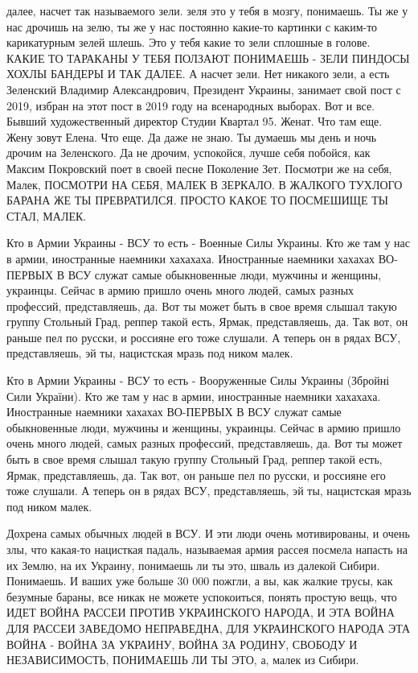 далее, насчет так называемого зели. зеля это у тебя в мозгу, понимаешь. Ты же у
нас дрочишь на зелю, ты же у нас постоянно какие-то картинки с каким-то
карикатурным зелей шлешь. Это у тебя какие то зели сплошные в голове. КАКИЕ ТО
ТАРАКАНЫ У ТЕБЯ ПОЛЗАЮТ ПОНИМАЕШЬ - ЗЕЛИ ПИНДОСЫ ХОХЛЫ БАНДЕРЫ И ТАК ДАЛЕЕ. А
насчет зели. Нет никакого зели, а есть Зеленский Владимир Александрович,
Президент Украины, занимает свой пост с 2019, избран на этот пост в 2019 году
на всенародных выборах. Вот и все. Бывший художественный директор Студии
Квартал 95. Женат. Что там еще. Жену зовут Елена. Что еще. Да даже не знаю. Ты
думаешь мы день и ночь дрочим на Зеленского. Да не дрочим, успокойся, лучше
себя побойся, как Максим Покровский поет в своей песне Поколение Зет. Посмотри
же на себя, Малек, ПОСМОТРИ НА СЕБЯ, МАЛЕК В ЗЕРКАЛО. В ЖАЛКОГО ТУХЛОГО БАРАНА
ЖЕ ТЫ ПРЕВРАТИЛСЯ. ПРОСТО КАКОЕ ТО ПОСМЕШИЩЕ ТЫ СТАЛ, МАЛЕК.

Кто в Армии Украины - ВСУ то есть - Военные Силы Украины. Кто же там у нас в
армии, иностранные наемники хахахаха. Иностранные наемники хахахах ВО-ПЕРВЫХ В
ВСУ служат самые обыкновенные люди, мужчины и женщины, украинцы. Сейчас в армию
пришло очень много людей, самых разных профессий, представляешь, да. Вот ты
может быть в свое время слышал такую группу Стольный Град, реппер такой есть,
Ярмак, представляешь, да. Так вот, он раньше пел по русски, и россияне его тоже
слушали. А теперь он в рядах ВСУ, представляешь, эй ты, нацистская мразь под
ником малек.

Кто в Армии Украины - ВСУ то есть - Вооруженные Силы Украины (Збройні Сили
України). Кто же там у нас в армии, иностранные наемники хахахаха. Иностранные
наемники хахахах ВО-ПЕРВЫХ В ВСУ служат самые обыкновенные люди, мужчины и
женщины, украинцы. Сейчас в армию пришло очень много людей, самых разных
профессий, представляешь, да. Вот ты может быть в свое время слышал такую
группу Стольный Град, реппер такой есть, Ярмак, представляешь, да. Так вот, он
раньше пел по русски, и россияне его тоже слушали. А теперь он в рядах ВСУ,
представляешь, эй ты, нацистская мразь под ником малек.

Дохрена самых обычных людей в ВСУ. И эти люди очень мотивированы, и очень злы,
что какая-то нацисткая падаль, называемая армия рассея посмела напасть на их
Землю, на их Украину, понимаешь ли ты это, шваль из далекой Сибири. Понимаешь.
И ваших уже больше 30 000 пожгли, а вы, как жалкие трусы, как безумные бараны,
все никак не можете успокоиться, понять простую вещь, что ИДЕТ ВОЙНА РАССЕИ
ПРОТИВ УКРАИНСКОГО НАРОДА, И ЭТА ВОЙНА ДЛЯ РАССЕИ ЗАВЕДОМО НЕПРАВЕДНА, ДЛЯ
УКРАИНСКОГО НАРОДА ЭТА ВОЙНА - ВОЙНА ЗА УКРАИНУ, ВОЙНА ЗА РОДИНУ, СВОБОДУ И
НЕЗАВИСИМОСТЬ, ПОНИМАЕШЬ ЛИ ТЫ ЭТО, а, малек из Сибири.

